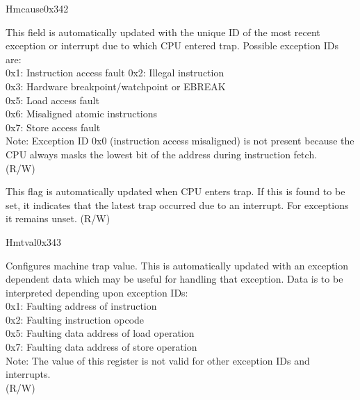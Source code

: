 \begin{register}{H}{mcause}{0x342}\label{regdesc:LPMCAUSE}
%
%
%
\regnewline%
\begin{regdesc}\begin{reglist}
\label{fielddesc:LPMCAUSECODE}\item [Exception Code] This field is automatically updated with the unique ID of the most recent exception or interrupt due to which CPU entered trap. Possible exception IDs are:\\
0x1: Instruction access fault
0x2: Illegal instruction\\
0x3: Hardware breakpoint/watchpoint or EBREAK\\
0x5: Load access fault\\
0x6: Misaligned atomic instructions\\
0x7: Store access fault\\
Note: Exception ID 0x0 (instruction access misaligned) is not present because the CPU always masks the lowest bit of the address during instruction fetch.\\
(R/W)
\label{fielddesc:LPMCAUSEINT}\item [Interrupt Flag] This flag is automatically updated when CPU enters trap. If this is found to be set, it indicates that the latest trap occurred due to an interrupt. For exceptions it remains unset.  (R/W)
\end{reglist}\end{regdesc}
\end{register}

\begin{register}{H}{mtval}{0x343}\label{regdesc:LPMTVAL}
%
\regnewline%
\begin{regdesc}\begin{reglist}
\label{fielddesc:LPMTVAL}\item [MTVAL] Configures machine trap value. This is automatically updated with an exception dependent data which may be useful for handling that exception. Data is to be interpreted depending upon exception IDs:\\
0x1: Faulting address of instruction\\
0x2: Faulting instruction opcode\\
0x5: Faulting data address of load operation\\
0x7: Faulting data address of store operation\\
Note: The value of this register is not valid for other exception IDs and interrupts.\\
(R/W)
\end{reglist}\end{regdesc}
\end{register}


